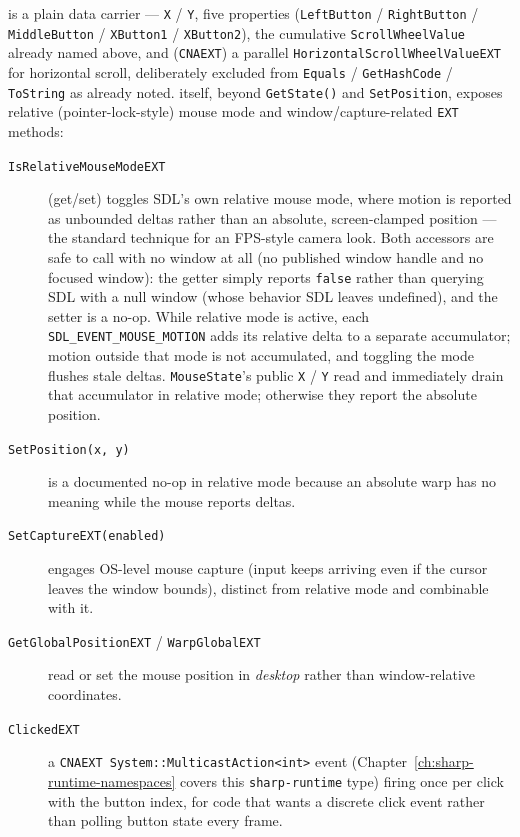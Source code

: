  is a plain data carrier --- \texttt{X} / \texttt{Y}, five
 properties (\texttt{LeftButton} / \texttt{RightButton} /
\texttt{MiddleButton} / \texttt{XButton1} / \texttt{XButton2}), the cumulative
\texttt{ScrollWheelValue} already named above, and (\texttt{CNAEXT}) a parallel
\texttt{HorizontalScrollWheelValueEXT} for horizontal scroll, deliberately excluded from
\texttt{Equals} / \texttt{GetHashCode} / \texttt{ToString} as already noted. 
itself, beyond \texttt{GetState()} and \texttt{SetPosition}, exposes relative
(pointer-lock-style) mouse mode and window/capture-related \texttt{EXT}
methods:

\begin{description}
\item[\texttt{IsRelativeMouseModeEXT}] (get/set)
  toggles SDL's own relative mouse mode, where motion is reported as unbounded deltas rather
  than an absolute, screen-clamped position --- the standard technique for an FPS-style camera
  look. Both accessors are safe to call with no window at all (no published window handle and
  no focused window): the getter simply reports \texttt{false} rather than querying SDL with a
  null window (whose behavior SDL leaves undefined), and the setter is a no-op. While relative
  mode is active, each
  \texttt{SDL\_EVENT\_MOUSE\_MOTION} adds its relative delta to a separate accumulator;
  motion outside that mode is not accumulated, and toggling the mode flushes stale deltas.
  \texttt{MouseState}'s public \texttt{X} / \texttt{Y} read and immediately drain that
  accumulator in relative mode; otherwise they report the absolute position.
\item[\texttt{SetPosition(x, y)}] is a documented no-op in relative mode because an absolute
  warp has no meaning while the mouse reports deltas.
\item[\texttt{SetCaptureEXT(enabled)}] engages OS-level mouse capture (input keeps arriving
  even if the cursor leaves the window bounds), distinct from relative mode and combinable
  with it.
\item[\texttt{GetGlobalPositionEXT} / \texttt{WarpGlobalEXT}] read or set the mouse position in
  \emph{desktop} rather than window-relative coordinates.
\item[\texttt{ClickedEXT}] a \texttt{CNAEXT System::MulticastAction<int>} event (Chapter~\ref{ch:sharp-runtime-namespaces}
  covers this \texttt{sharp-runtime} type) firing once per click with the button
  index, for code that wants a discrete click event rather than polling button state every
  frame.
\end{description}

